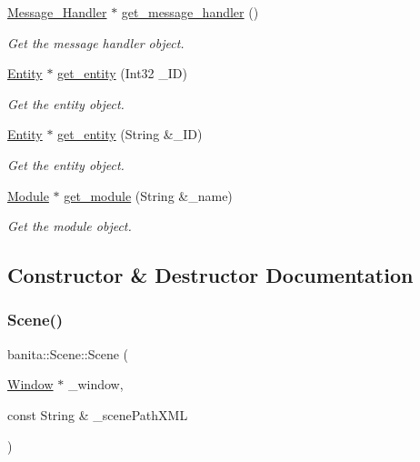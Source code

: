 \begin{DoxyCompactItemize}
\mbox{\hyperlink{classbanita_1_1_message___handler}{Message\+\_\+\+Handler}} $\ast$ \mbox{\hyperlink{classbanita_1_1_scene_ab95cc89547ab5d33414a7743bfe9f60f}{get\+\_\+message\+\_\+handler}} ()
\begin{DoxyCompactList}\small\item\em Get the message handler object. \end{DoxyCompactList}\item 
\mbox{\hyperlink{classbanita_1_1_entity}{Entity}} $\ast$ \mbox{\hyperlink{classbanita_1_1_scene_abbb415ef292d34cc6882af2d59e5a25d}{get\+\_\+entity}} (Int32 \+\_\+\+ID)
\begin{DoxyCompactList}\small\item\em Get the entity object. \end{DoxyCompactList}\item 
\mbox{\hyperlink{classbanita_1_1_entity}{Entity}} $\ast$ \mbox{\hyperlink{classbanita_1_1_scene_a9acedd39a5c861b803818635c355a81f}{get\+\_\+entity}} (String \&\+\_\+\+ID)
\begin{DoxyCompactList}\small\item\em Get the entity object. \end{DoxyCompactList}\item 
\mbox{\hyperlink{classbanita_1_1_module}{Module}} $\ast$ \mbox{\hyperlink{classbanita_1_1_scene_a6c535a65a7fcd80bf6d1d04a59b056cb}{get\+\_\+module}} (String \&\+\_\+name)
\begin{DoxyCompactList}\small\item\em Get the module object. \end{DoxyCompactList}\end{DoxyCompactItemize}


\subsection{Constructor \& Destructor Documentation}
\mbox{\label{classbanita_1_1_scene_ac1cd51735d74d50dcefa500f715988a2}} 
\subsubsection{\texorpdfstring{Scene()}{Scene()}}
{\footnotesize\ttfamily banita\+::\+Scene\+::\+Scene (\begin{DoxyParamCaption}\item[{\mbox{\hyperlink{classbanita_1_1_window}{Window}} $\ast$}]{\+\_\+window,  }\item[{const String \&}]{\+\_\+scene\+Path\+X\+ML }\end{DoxyParamCaption})}



